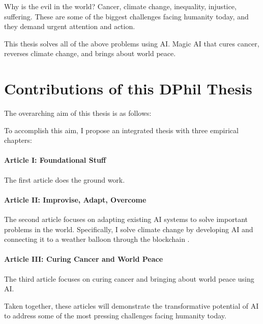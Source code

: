Why is the evil in the world? Cancer, climate change, inequality, injustice, suffering. These are some of the biggest challenges facing humanity today, and they demand urgent attention and action.

This thesis solves all of the above problems using AI. Magic AI that cures cancer, reverses climate change, and brings about world peace.


\section{Contributions of this DPhil Thesis}

The overarching aim of this thesis is as follows:



To accomplish this aim, I propose an integrated thesis with three empirical chapters:

\paragraph{Article I: Foundational Stuff}
The first article does the ground work.


\paragraph{Article II: Improvise, Adapt, Overcome}
The second article focuses on adapting existing AI systems to solve important problems in the world.
Specifically, I solve climate change by developing AI and connecting it to a weather balloon through the blockchain \citep{jevonsCoalQuestionInquiry1866}. 



\paragraph{Article III: Curing Cancer and World Peace}
The third article focuses on curing cancer and bringing about world peace using AI.



Taken together, these articles will demonstrate the transformative potential of AI to address some of the most pressing challenges facing humanity today.
